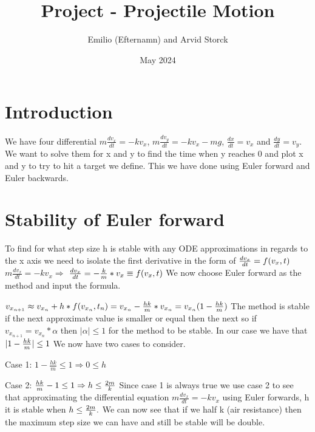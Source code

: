 \documentclass{article}
\title{Project - Projectile Motion}
\author{Emilio (Efternamn) and Arvid Storck}
\date{May 2024}
\begin{document}
\maketitle
\section{Introduction}
We have four differential $m\frac{dv_x}{dt}=-kv_x$, $m\frac{dv_y}{dt}=-kv_x-mg$, $\frac{dx}{dt}=v_x$ and $\frac{dy}{dt}=v_y$. We want to solve them for x and y to find the time when y reaches 0 and plot x and y to try to hit a target we define. This we have done using Euler forward and Euler backwards.



\section{Stability of Euler forward}

To find for what step size h is stable with any ODE approximations in regards to the x axis we need to isolate the first derivative in the form of $\frac{dv_x}{dt}=f(v_x,t)\newline\newline$
$m\frac{dv_x}{dt}=-kv_x\Rightarrow$
$\frac{dv_x}{dt}=-\frac{k}{m}*v_x\equiv f(v_x,t)\newline\newline$
We now choose Euler forward as the method and input the formula.

$v_{x_{n+1}}\approx v_{x_{n}}+h*f(v_{x_{n}},t_n)=v_{x_{n}}-\frac{hk}{m}*v_{x_{n}}=v_{x_{n}}(1-\frac{hk}{m})\newline\newline$
The method is stable if the next approximate value is smaller or equal then the next so if $v_{x_{n+1}}=v_{x_{n}}*\alpha$ then $|\alpha|\le 1$ for the method to be stable. In our case we have that $|1-\frac{hk}{m}|\le 1\newline\newline$
We now have two cases to consider.

Case 1: $1-\frac{hk}{m}\le 1\Rightarrow 0\le h$

Case 2: $\frac{hk}{m}-1\le 1\Rightarrow h\le \frac{2m}{k}\newline\newline$
Since case 1 is always true we use case 2 to see that approximating the differential equation $m\frac{dv_x}{dt}=-kv_x$ using Euler forwards, h it is stable when $h\le \frac{2m}{k}.\newline\newline$
We can now see that if we half k (air resistance) then the maximum step size we can have and still be stable will be double.
\end{document}
